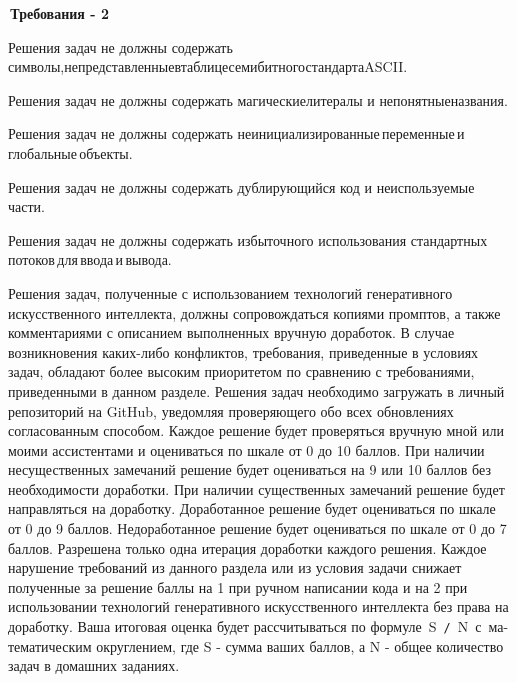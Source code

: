 \documentclass[a4paper,12pt]{article}
\renewenvironment{itemize}
{
    \begin{list}{\labelitemi}
    {
      \setlength{\topsep}{0pt}
      \setlength{\partopsep}{0pt}
      \setlength{\parskip}{0pt}
      \setlength{\itemsep}{0pt}
      \setlength{\parsep}{0pt}
      \setlength{\leftmargin}{14.5pt}
    }
}{\end{list}}
\begin{document}
\bigskip

\,\textbf{Требования - 2}

\medskip

\begin{itemize}

    \item Решения задач не должны содержать символы,\;не\;представленные\;в\;таблице\;семибитного\:стандарта\:ASCII.

    \smallskip

    \item Решения задач не должны содержать магические\;литералы и непонятные\;названия.

    \smallskip

    \item Решения задач не должны содержать неинициализированные\,переменные\,и\,глобальные\,объекты.

    \smallskip

    \item Решения задач не должны содержать дублирующийся код и неиспользуемые части.

    \smallskip

    \item Решения задач не должны содержать избыточного использования стандартных\,потоков\,для\,ввода\,и\,вывода.

\end{itemize}

\bigskip

Решения задач, полученные с использованием технологий генеративного искусственного интеллекта, должны сопровождаться копиями промптов, а также комментариями с описанием выполненных вручную доработок. В случае возникновения каких-либо конфликтов, требования, приведенные в условиях задач, обладают более высоким приоритетом по сравнению с требованиями, приведенными в данном разделе. Решения задач необходимо загружать в личный репозиторий на GitHub, уведомляя проверяющего обо всех обновлениях согласованным способом. Каждое решение будет проверяться вручную мной или моими ассистентами и оцениваться по шкале от 0 до 10 баллов. При наличии несущественных замечаний решение будет оцениваться на 9 или 10 баллов без необходимости доработки. При наличии существенных замечаний решение будет направляться на доработку. Доработанное решение будет оцениваться по шкале от 0 до 9 баллов. Недоработанное решение будет оцениваться по шкале от 0 до 7 баллов. Разрешена только одна итерация доработки каждого решения. Каждое нарушение требований из данного раздела или из условия задачи снижает полученные за решение баллы на 1 при ручном написании кода и на 2 при использовании технологий генеративного искусственного интеллекта без права на доработку. Ваша итоговая оценка будет рассчитываться по формуле~S~\texttt{/}~N~с~ма- тематическим округлением, где S - сумма ваших баллов, а N - общее количество задач в домашних заданиях.
\end{document}
